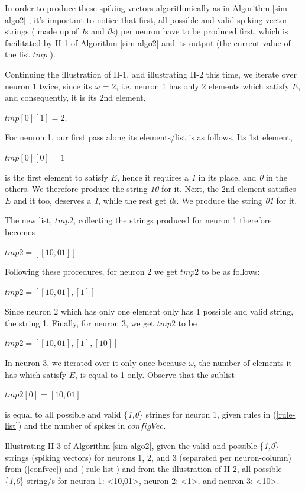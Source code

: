 \documentclass{acm_proc_article-sp}
\begin{document}
In order to produce these spiking vectors algorithmically as in Algorithm \ref{sim-algo2} , it's
important to notice that first, all possible and valid spiking
vector strings ( made up of \textit{1}s and \textit{0}s) per neuron have to be
produced first, which is facilitated by II-1 of Algorithm \ref{sim-algo2} and its output (the
current value of the list $tmp$ ).

Continuing the illustration of II-1, and illustrating II-2 this time, we iterate over neuron 1 twice, since its $\omega$ = 2, i.e. neuron 1 has only 2 elements which satisfy $E$, and consequently, it is its 2nd element,

		$tmp[ 0 ] [ 1 ] = 2.$ 

For neuron 1, our first pass along its elements/list is as follows. Its 1st element,

		$tmp[ 0 ][ 0 ] = 1$

is the first element to satisfy $E$, hence it requires a \textit{1} in its place, and \textit{0} in the others. We therefore produce the string	\textit{10} for it. Next, the 2nd element satisfies $E$ and it too, deserves a \textit{1}, while the rest get \textit{0}s. We produce the string \textit{01} for it. 

The new list, $tmp2$, collecting the strings produced for neuron 1 therefore becomes

		$tmp2 = [ [ 10, 01 ] ] $

Following these procedures, for neuron 2 we get $tmp2$ to be as follows: 

		$tmp2 = [ [ 10, 01 ], [ 1 ] ]$ 

Since neuron 2 which has only one element only has 1 possible and valid string, the string 1. 
Finally, for neuron 3, we get $tmp2$ to be 

		$tmp2 = [ [ 10, 01 ], [ 1 ], [ 10 ] ] $

In neuron 3, we iterated over it only once because $\omega$, the number of elements it has which satisfy $E$, is equal to 1 only. 
Observe that the sublist 

		$tmp2[ 0 ] = [ 10, 01 ]$ 

is equal to all possible and valid \{\textit{1,0}\} strings for neuron 1, given rules in (\ref{rule-list}) and the number of spikes in $configVec$. 

Illustrating II-3 of Algorithm \ref{sim-algo2}, given the valid and
possible \{\textit{1,0}\} strings (spiking vectors) for neurons 1, 2, and 3 (separated per neuron-column) from (\ref{confvec}) and (\ref{rule-list}) and from the illustration of II-2, all possible \{\textit{1,0}\} string/s for neuron 1: <10,01>, neuron 2: <1>, and neuron 3: <10>.
\end{document}
